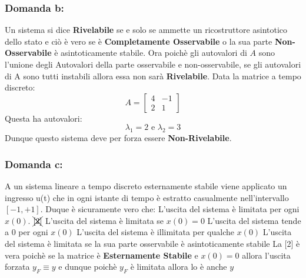 \documentclass[a4paper]{report}
\begin{document}
\subsubsection*{Domanda b:}
Un sistema si dice \textbf{Rivelabile} se e solo se ammette un ricostruttore asintotico dello stato e ciò è vero se è \textbf{Completamente Osservabile} o la sua parte \textbf{Non-Osservabile} è asintoticamente stabile.
Ora poichè gli autovalori di $A$ sono l'unione degli Autovalori della parte osservabile e non-osservabile, se gli autovalori di A sono tutti instabili allora essa non sarà \textbf{Rivelabile}.
\medskip \newline
Data la matrice a tempo discreto:
\[
A=\begin{bmatrix}
4 & -1\\
2 & 1
\end{bmatrix}
\]
Questa ha autovalori:
\[
\lambda_1=2 \text{ e } \lambda_2=3
\]
Dunque questo sistema deve per forza essere \textbf{Non-Rivelabile}.
\subsubsection*{Domanda c:}
A un sistema lineare a tempo discreto esternamente stabile viene applicato un ingresso u(t) che in ogni istante di tempo è estratto casualmente nell’intervallo $[-1, +1]$. Duque è sicuramente vero che:
\bigskip \newline
[1] L’uscita del sistema è limitata per ogni $x(0)$. \newline
$\xcancel{[2]}$  L’uscita del sistema è limitata se $x(0) = 0$ \newline
[3]  L’uscita del sistema tende a $0$ per ogni $x(0)$ \newline
[4] L’uscita del sistema è illimitata per qualche $x(0)$ \newline
[5] L’uscita del sistema è limitata se la sua parte osservabile è asintoticamente stabile \newline
\newline
La [2] è vera poichè se la matrice è \textbf{Esternamente Stabile} e $x(0)=0$ allora l'uscita forzata $y_F\equiv y$ e dunque poichè $y_F$ è limitata allora lo è anche $y$
\end{document}
